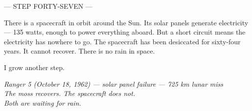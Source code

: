 \documentclass[12pt]{article}
\begin{document}
\begin{center}
--- STEP FORTY-SEVEN ---
\end{center}

\indent There is a spacecraft in orbit around the Sun. Its solar panels generate electricity --- 135 watts, enough to power everything aboard. But a short circuit means the electricity has nowhere to go. The spacecraft has been desiccated for sixty-four years. It cannot recover. There is no rain in space.

I grow another step.

\vfill
\begin{center}
\small\itshape
Ranger 5 (October 18, 1962) --- solar panel failure --- 725 km lunar miss\\
The moss recovers. The spacecraft does not.\\
Both are waiting for rain.
\end{center}
\end{document}
